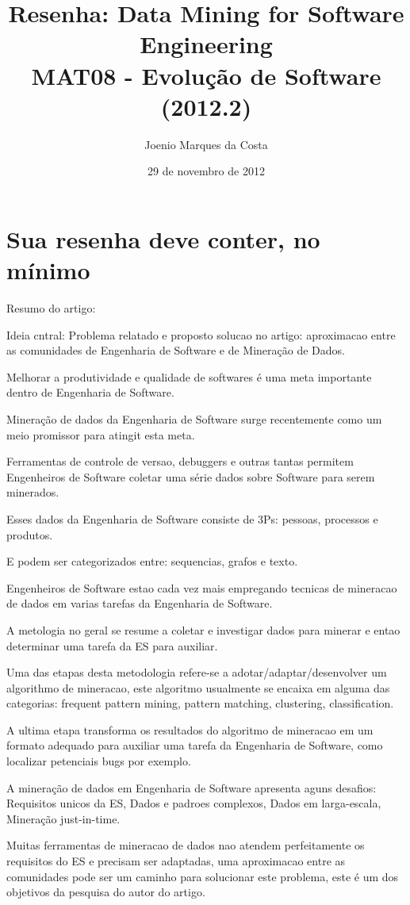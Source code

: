 \documentclass{article}
\title{Resenha: Data Mining for Software Engineering \\
 \large MAT08 - Evolução de Software (2012.2)}
\author{Joenio Marques da Costa}
\date{29 de novembro de 2012}
\begin{document}
\maketitle

\section{Sua resenha deve conter, no mínimo}

Resumo do artigo:

Ideia cntral: Problema relatado e proposto solucao no artigo: aproximacao entre as comunidades de Engenharia de Software e de Mineração de Dados.

Melhorar a produtividade e qualidade de softwares é uma meta importante dentro de Engenharia de Software.

Mineração de dados da Engenharia de Software surge recentemente como um meio promissor para atingit esta meta.

Ferramentas de controle de versao, debuggers e outras tantas permitem Engenheiros de Software coletar uma série dados sobre Software para serem minerados.

Esses dados da Engenharia de Software consiste de 3Ps: pessoas, processos e produtos.

E podem ser categorizados entre: sequencias, grafos e texto.

Engenheiros de Software estao cada vez mais empregando tecnicas de mineracao de dados em varias tarefas da Engenharia de Software.

A metologia no geral se resume a coletar e investigar dados para minerar e entao determinar uma tarefa da ES para auxiliar.

Uma das etapas desta metodologia refere-se a adotar/adaptar/desenvolver um algorithmo de mineracao, este algoritmo usualmente se encaixa em alguma das categorias: frequent pattern mining, pattern matching, clustering, classification.

A ultima etapa transforma os resultados do algoritmo de mineracao em um formato adequado para auxiliar uma tarefa da Engenharia de Software, como localizar petenciais bugs por exemplo.

A mineração de dados em Engenharia de Software apresenta aguns desafios: Requisitos unicos da ES, Dados e padroes complexos, Dados em larga-escala, Mineração just-in-time.

Muitas ferramentas de mineracao de dados nao atendem perfeitamente os requisitos do ES e precisam ser adaptadas, uma aproximacao entre as comunidades pode ser um caminho para solucionar este problema, este é um dos objetivos da pesquisa do autor do artigo.
\end{document}
